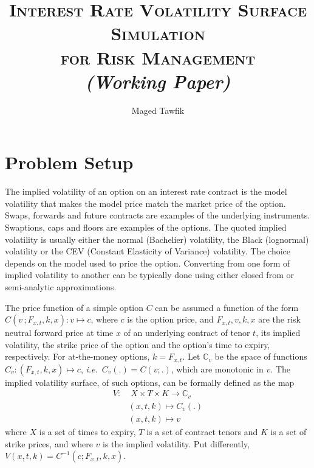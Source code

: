 \documentclass[12pt,oneside]{article}
\title{
  \textsc{Interest Rate Volatility Surface Simulation\\
  for Risk Management}\\%
  \large{\em{(Working Paper)}}
}
\author{Maged Tawfik%
}
\newcommand{\beqn}{\begin{equation}}
\newcommand{\eeqn}{\end{equation}}
\numberwithin{equation}{section}
\newcommand{\ie}{{\em i.e.}\ }
\begin{document}
\pagestyle{fancy}

\maketitle
\thispagestyle{fpstyle} %
\begin{center}
\end{center}
%
\section{Problem Setup}
The implied volatility of an option on an interest rate contract
is the model volatility that makes the model price match the
market price of the option.
Swaps, forwards and future contracts
are examples of the underlying instruments.
Swaptions, caps and floors are examples of the options.
The quoted implied volatility is usually either the normal (Bachelier)
volatility, the Black (lognormal) volatility or the CEV (Constant
Elasticity of Variance) volatility.
The choice depends on the model used to price the option.
Converting from one form of implied volatility to another can be
typically done using either closed from or semi-analytic approximations.

The price function of a simple option $C$ can be assumed a function of
the form $C(v\,; F_{x,t}, k, x): v\mapsto c$, where $c$ is the option price,
and $F_{x,t}, v, k, x$ are the risk neutral forward price at time $x$ of an
underlying contract of tenor $t$, its implied volatility,
the strike price of the option and
the option's time to expiry, respectively.
For at-the-money options, $k=F_{x,t}$.
Let $\mathbb{C}_v$ be the space of functions $C_v:(F_{x,t},k,x)\mapsto c$,
\ie $C_v(.)=C(v;.)$, which are monotonic in $v$.
The implied volatility surface, of such options, can be formally defined as the map
\beqn
\begin{aligned}
    V\!:&\;X\times T\times K\rightarrow \mathbb{C}_v\\
    &(x,t,k)\mapsto C_v(.)\\
    &(x,t,k)\mapsto v
\end{aligned}
\eeqn
where $X$ is a set of times to expiry, $T$ is a set of contract tenors and
$K$ is a set of strike prices, and where $v$ is the implied volatility. 
Put differently, $V(x,t,k)=C^{-1}(c;F_{x,t},k,x)$.
\end{document}

